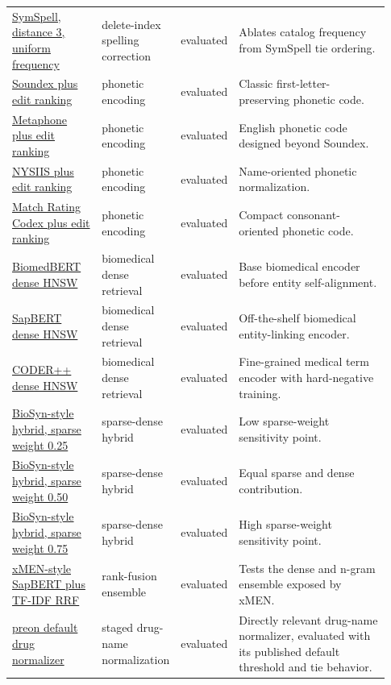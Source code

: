 \begin{landscape}
\begin{scriptsize}
\begin{longtable}{@{}L{0.24\linewidth}L{0.15\linewidth}L{0.12\linewidth}L{0.42\linewidth}@{}}
\href{https://github.com/wolfgarbe/SymSpell}{SymSpell, distance 3, uniform frequency} & delete-index spelling correction & evaluated & Ablates catalog frequency from SymSpell tie ordering. \\
\href{https://github.com/jamesturk/jellyfish}{Soundex plus edit ranking} & phonetic encoding & evaluated & Classic first-letter-preserving phonetic code. \\
\href{https://github.com/jamesturk/jellyfish}{Metaphone plus edit ranking} & phonetic encoding & evaluated & English phonetic code designed beyond Soundex. \\
\href{https://github.com/jamesturk/jellyfish}{NYSIIS plus edit ranking} & phonetic encoding & evaluated & Name-oriented phonetic normalization. \\
\href{https://github.com/jamesturk/jellyfish}{Match Rating Codex plus edit ranking} & phonetic encoding & evaluated & Compact consonant-oriented phonetic code. \\
\href{https://github.com/microsoft/BiomedNLP-BiomedBERT}{BiomedBERT dense HNSW} & biomedical dense retrieval & evaluated & Base biomedical encoder before entity self-alignment. \\
\href{https://github.com/cambridgeltl/sapbert}{SapBERT dense HNSW} & biomedical dense retrieval & evaluated & Off-the-shelf biomedical entity-linking encoder. \\
\href{https://github.com/GanjinZero/CODER}{CODER++ dense HNSW} & biomedical dense retrieval & evaluated & Fine-grained medical term encoder with hard-negative training. \\
\href{https://github.com/dmis-lab/BioSyn}{BioSyn-style hybrid, sparse weight 0.25} & sparse-dense hybrid & evaluated & Low sparse-weight sensitivity point. \\
\href{https://github.com/dmis-lab/BioSyn}{BioSyn-style hybrid, sparse weight 0.50} & sparse-dense hybrid & evaluated & Equal sparse and dense contribution. \\
\href{https://github.com/dmis-lab/BioSyn}{BioSyn-style hybrid, sparse weight 0.75} & sparse-dense hybrid & evaluated & High sparse-weight sensitivity point. \\
\href{https://github.com/hpi-dhc/xmen}{xMEN-style SapBERT plus TF-IDF RRF} & rank-fusion ensemble & evaluated & Tests the dense and n-gram ensemble exposed by xMEN. \\
\href{https://github.com/ermshaua/preon}{preon default drug normalizer} & staged drug-name normalization & evaluated & Directly relevant drug-name normalizer, evaluated with its published default threshold and tie behavior. \\

\end{longtable}
\end{scriptsize}
\end{landscape}
